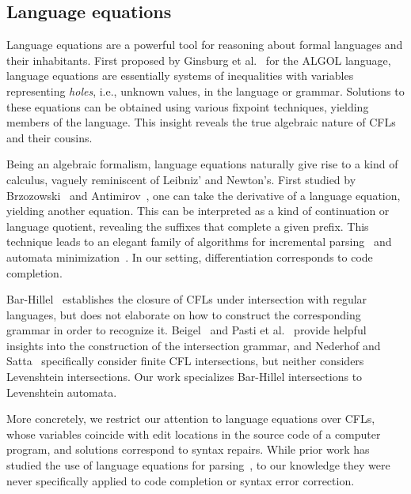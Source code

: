 \documentclass[sigplan,review,acmsmall,nonacm,anonymous]{acmart}\settopmatter{printfolios=false,printccs=false,printacmref=false}
\begin{document}

  \subsection{Language equations}

  Language equations are a powerful tool for reasoning about formal languages and their inhabitants. First proposed by Ginsburg et al.~\cite{ginsburg1962two} for the ALGOL language, language equations are essentially systems of inequalities with variables representing \textit{holes}, i.e., unknown values, in the language or grammar. Solutions to these equations can be obtained using various fixpoint techniques, yielding members of the language. This insight reveals the true algebraic nature of CFLs and their cousins.

  Being an algebraic formalism, language equations naturally give rise to a kind of calculus, vaguely reminiscent of Leibniz' and Newton's. First studied by Brzozowski~\cite{brzozowski1964derivatives, brzozowski1980equations} and Antimirov~\cite{antimirov1996partial}, one can take the derivative of a language equation, yielding another equation. This can be interpreted as a kind of continuation or language quotient, revealing the suffixes that complete a given prefix. This technique leads to an elegant family of algorithms for incremental parsing~\cite{might2011parsing, adams2016complexity} and automata minimization~\cite{brzozowski1962canonical}. In our setting, differentiation corresponds to code completion.

  Bar-Hillel~\cite{bar1961formal} establishes the closure of CFLs under intersection with regular languages, but does not elaborate on how to construct the corresponding grammar in order to recognize it. Beigel~\cite{beigelproof} and Pasti et al.~\cite{pasti2023intersection} provide helpful insights into the construction of the intersection grammar, and Nederhof and Satta~\cite{nederhof2004language} specifically consider finite CFL intersections, but neither considers Levenshtein intersections. Our work specializes Bar-Hillel intersections to Levenshtein automata.

  More concretely, we restrict our attention to language equations over CFLs, whose variables coincide with edit locations in the source code of a computer program, and solutions correspond to syntax repairs. While prior work has studied the use of language equations for parsing~\cite{might2011parsing}, to our knowledge they were never specifically applied to code completion or syntax error correction.
\end{document}

